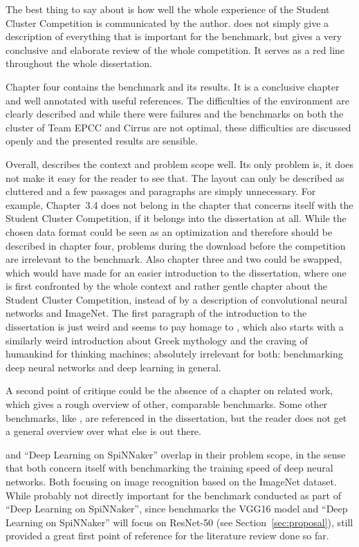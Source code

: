 \documentclass{article}
\begin{document}
The best thing to say about \citet{nita_2018} is how well
the whole experience of the Student Cluster Competition is
communicated by the author.
\citet{nita_2018} does not simply give a description of
everything that is important for the benchmark, but gives
a very conclusive and elaborate review of the whole
competition.
It serves as a red line throughout the whole dissertation.

Chapter four contains the benchmark and its results.
It is a conclusive chapter and well annotated with useful
references.
The difficulties of the environment are clearly described
and while there were failures and the benchmarks on both
the cluster of Team EPCC and Cirrus are not optimal, these
difficulties are discussed openly and the presented results
are sensible.

Overall, \citet{nita_2018} describes the context and
problem scope well.
Its only problem is, it does not make it easy for the
reader to see that.
The layout can only be described as cluttered and a few
passages and paragraphs are simply unnecessary.
For example, Chapter~3.4 does not belong in the chapter
that concerns itself with the Student Cluster Competition,
if it belongs into the dissertation at all.
While the chosen data format could be seen as an
optimization and therefore should be described in chapter
four, problems during the download before the competition
are irrelevant to the benchmark.
Also chapter three and two could be swapped, which would
have made for an easier introduction to the dissertation,
where one is first confronted by the whole context and
rather gentle chapter about the Student Cluster
Competition, instead of by a description of convolutional
neural networks and ImageNet.
The first paragraph of the introduction to the dissertation
is just weird and seems to pay homage to
\citet{goodfellow2016}, which also starts with a similarly
weird introduction about Greek mythology and the craving of
humankind for thinking machines; absolutely irrelevant for
both: benchmarking deep neural networks and deep learning
in general.

A second point of critique could be the absence of a
chapter on related work, which gives a rough overview of
other, comparable benchmarks.
Some other benchmarks, like \citet{you2017}, are referenced
in the dissertation, but the reader does not get a general
overview over what else is out there.

\citet{nita_2018} and ``Deep Learning on SpiNNaker''
overlap in their problem scope, in the sense that both
concern itself with benchmarking the training speed of
deep neural networks.
Both focusing on image recognition based on the ImageNet
dataset.
While probably not directly important for the benchmark
conducted as part of ``Deep Learning on SpiNNaker'',
since \citet{nita_2018} benchmarks the VGG16 model and
``Deep Learning on SpiNNaker'' will focus on ResNet-50
(see Section~\ref{sec:proposal}),
\citet{nita_2018} still provided a great first point of
reference for the literature review done so far.
\end{document}
